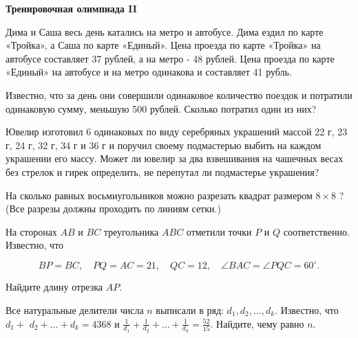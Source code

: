 \centerline{\bf \Huge Тренировочная олимпиада II}
\centerline{\bf \Huge }

\begin{flushright}
        \scriptsize{}
\end{flushright}

Дима и Саша весь день катались на метро и автобусе. Дима ездил по карте «Тройка», а Саша по карте «Единый». Цена проезда по карте «Тройка» на автобусе составляет 37 рублей, а на метро - 48 рублей. Цена проезда по карте «Единый» на автобусе и на метро одинакова и составляет 41 рубль.

Известно, что за день они совершили одинаковое количество поездок и потратили одинаковую сумму, меньшую 500 рублей. Сколько потратил один из них?


Ювелир изготовил 6 одинаковых по виду серебряных украшений массой 22 г, 23 г, 24 г, 32 г, 34 г и 36 г и поручил своему подмастерью выбить на каждом украшении его массу. Может ли ювелир за два взвешивания на чашечных весах без стрелок и гирек определить, не перепутал ли подмастерье украшения?

На сколько равных восьмиугольников можно разрезать квадрат размером $8 \times 8$ ? (Все разрезы должны проходить по линиям сетки.)

На сторонах $A B$ и $B C$ треугольника $A B C$ отметили точки $P$ и $Q$ соответственно. Известно, что

$$
B P=B C, \quad P Q=A C=21, \quad Q C=12, \quad \angle B A C=\angle P Q C=60^{\circ} .
$$


Найдите длину отрезка $A P$.

Все натуральные делители числа $n$ выписали в ряд: $d_1, d_2, \ldots, d_k$. Известно, что $d_1+$ $d_2+\ldots+d_k=4368$ и $\frac{1}{d_1}+\frac{1}{d_2}+\ldots+\frac{1}{d_k}=\frac{52}{15}$. Найдите, чему равно $n$.